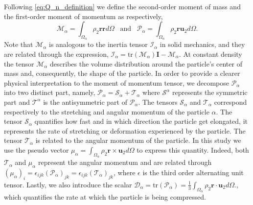 Following \ref{eq:Q_n_definition} we define the second-order moment of mass and the first-order moment of momentum as respectively,
\begin{equation}
    \mathcal{M}_\alpha 
    = \int_{\Omega_\alpha} \rho_2 \textbf{r} \textbf{r} d\Omega
    \;\;\;\text{and}\;\;\;
    \mathcal{P}_\alpha 
    = \int_{\Omega_\alpha} \rho_2 \textbf{r} \textbf{u}_2 d\Omega.
    \label{eq:first_moment_of_momentum_def}
\end{equation}
Note that $\mathcal{M}_\alpha$ is analogous to the inertia tensor $\mathcal{I}_\alpha$ in solid mechanics, and they are related through the expression, $\mathcal{I}_\alpha = \text{tr}(\mathcal{M}_\alpha)\textbf{I} - \mathcal{M}_\alpha$.
At constant density the tensor $\mathcal{M}_\alpha$ describes the volume distribution around the particle's center of mass and, consequently, the shape of the particle.
In order to provide a clearer physical interpretation to the moment of momentum tensor, we decompose $\mathcal{P}_\alpha$ into two distinct part, namely,
$\mathcal{P}_\alpha = \mathcal{S}_\alpha+\mathcal{T}_\alpha$ where $\mathcal{S}^\alpha$ represents the symmetric part and $\mathcal{T}^\alpha$ is the antisymmetric part of $\mathcal{P}_\alpha$.
The tensors $\mathcal{S}_\alpha$ and $\mathcal{T}_\alpha$ correspond respectively to the stretching and angular momentum of the particle $\alpha$. 
The tensor $\mathcal{S}_\alpha$ quantifies how fast and in which direction the particle get elongated, it represents the rate of stretching or deformation experienced by the particle.
The tensor $\mathcal{T}_\alpha$ is related to the angular momentum of the particle. 
In this study we use the pseudo vector $\mu_\alpha = \int_{\Omega_\alpha} \rho_2 \textbf{r} \times \textbf{u}_2 d\Omega$ to express this quantity. 
Indeed, both  $\mathcal{T}_\alpha$ and $\mu_\alpha$ represent the angular momentum and are related through $(\mu_\alpha)_i = \epsilon_{ijk} (\mathcal{P}_\alpha)_{jk}= \epsilon_{ijk} (\mathcal{T}_\alpha)_{jk}$, where $\epsilon$ is the third order alternating unit tensor. 
Lastly, we also introduce the scalar $\mathcal{D}_\alpha = \text{tr}(\mathcal{P}_\alpha) = \frac{1}{3}\int_{\Omega_\alpha} \rho_2 \textbf{r} \cdot \textbf{u}_2 d\Omega.$, which quantifies the rate at which the particle is being compressed.


